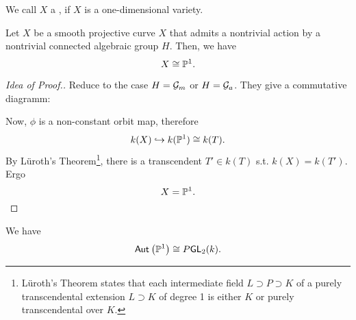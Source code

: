 \begin{lemma}[Fact]
	We call $X$ a , if $X$ is a one-dimensional variety.
	
	Let $X$ be a smooth projective {curve} $X$ that admits a nontrivial action by a nontrivial connected algebraic group $H$.
	Then, we have
	\[ X \isom{} \P^1. \]
\end{lemma}
\begin{proof}[Idea of Proof.]
		Reduce to the case $H = \G_m$ or $H= \G_a$. They give a commutative diagramm:
	\begin{center}
	\end{center}
	Now, $\phi$ is a non-constant orbit map, therefore
	\[ k(X) \inj{} k(\P^1) \isom{} k(T). \]
	By Lüroth's Theorem\footnote{Lüroth's Theorem states that each intermediate field $L \supset P \supset K$ of a purely transcendental extension $L\supset K$ of degree 1 is either $K$ or purely transcendental over $K$.}, there is a transcendent $T' \in k(T)$ s.t. $k(X) = k(T')$.
	Ergo
	\[ X = \P^1.\qedhere \]
\end{proof}

\begin{lemma}[Fact]
	We have
	\[ \Aut{}{\P^1} \isom{} P\GL_2(k). \]
\end{lemma}

